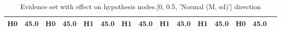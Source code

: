 \begin{table}
\begin{tabular}{c|cc|cc|cc|cc|cc|cc|cc}
\cellcolor{Bittersweet}H0&\cellcolor{Bittersweet}45.0&\cellcolor{Bittersweet}H0&\cellcolor{Bittersweet}45.0&\cellcolor{Bittersweet}H1&\cellcolor{Bittersweet}45.0&\cellcolor{Bittersweet}H1&\cellcolor{Bittersweet}45.0&\cellcolor{Bittersweet}H1&\cellcolor{Bittersweet}45.0&\cellcolor{Bittersweet}H1&\cellcolor{Bittersweet}45.0&\cellcolor{Bittersweet}H0&\cellcolor{Bittersweet}45.0\\\bottomrule\end{tabular}\caption{Evidence set with effect on hypothesis nodes.[0, 0.5, 'Normal (M, sd)'] direction}\end{table}